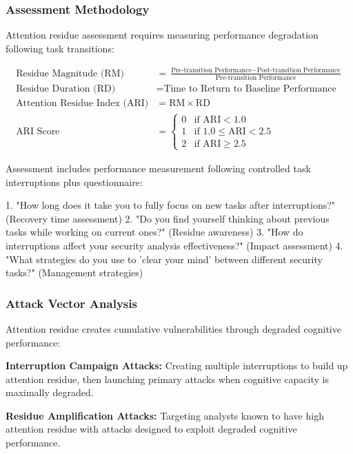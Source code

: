 \documentclass[11pt,a4paper]{article}
\begin{document}
\subsubsection{Assessment Methodology}

Attention residue assessment requires measuring performance degradation following task transitions:

\begin{align}
\text{Residue Magnitude (RM)} &= \frac{\text{Pre-transition Performance} - \text{Post-transition Performance}}{\text{Pre-transition Performance}} \\
\text{Residue Duration (RD)} &= \text{Time to Return to Baseline Performance} \\
\text{Attention Residue Index (ARI)} &= \text{RM} \times \text{RD} \\
\text{ARI Score} &= \begin{cases}
0 & \text{if ARI} < 1.0 \\
1 & \text{if } 1.0 \leq \text{ARI} < 2.5 \\
2 & \text{if ARI} \geq 2.5
\end{cases}
\end{align}

Assessment includes performance measurement following controlled task interruptions plus questionnaire:

1. "How long does it take you to fully focus on new tasks after interruptions?" (Recovery time assessment)
2. "Do you find yourself thinking about previous tasks while working on current ones?" (Residue awareness)
3. "How do interruptions affect your security analysis effectiveness?" (Impact assessment)
4. "What strategies do you use to 'clear your mind' between different security tasks?" (Management strategies)

\subsubsection{Attack Vector Analysis}

Attention residue creates cumulative vulnerabilities through degraded cognitive performance:

\textbf{Interruption Campaign Attacks:} Creating multiple interruptions to build up attention residue, then launching primary attacks when cognitive capacity is maximally degraded.

\textbf{Residue Amplification Attacks:} Targeting analysts known to have high attention residue with attacks designed to exploit degraded cognitive performance.
\end{document}
